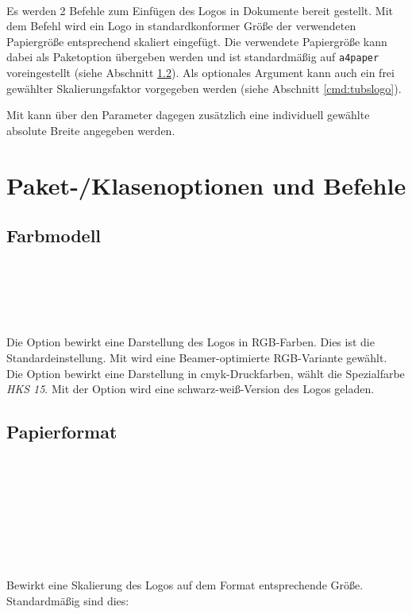 \begin{Declaration}
  \\
\end{Declaration}


Es werden 2 Befehle zum Einfügen des Logos in Dokumente bereit gestellt.
Mit dem Befehl  wird ein Logo in
standardkonformer Größe der verwendeten Papiergröße entsprechend skaliert
eingefügt. Die verwendete Papiergröße kann dabei als Paketoption übergeben
werden und ist standardmäßig auf \lstinline{a4paper} voreingestellt
(siehe Abschnitt \ref{options:papersize}).
Als optionales Argument kann auch ein frei gewählter Skalierungsfaktor
vorgegeben werden (siehe Abschnitt \ref{cmd:tubslogo}).

Mit  kann über den Parameter  dagegen
zusätzlich eine individuell gewählte absolute Breite angegeben werden.


\section{Paket-/Klasenoptionen und Befehle}

\subsection{Farbmodell}\label{options:color}

\begin{Declaration}
  \\
  \\
  \\
  \\
\end{Declaration}

Die Option  bewirkt eine Darstellung des Logos in RGB-Farben.
Dies ist die Standardeinstellung.
Mit  wird eine Beamer-optimierte RGB-Variante gewählt.
Die Option  bewirkt eine Darstellung in cmyk-Druckfarben,
 wählt die Spezialfarbe \emph{HKS 15}.
Mit der Option  wird eine schwarz-weiß-Version des Logos geladen.

\subsection{Papierformat}\label{options:papersize}

\begin{Declaration}
  \\
  \\
  \\
  \\
  \\
  \\
  \\
\end{Declaration}
Bewirkt eine Skalierung des Logos auf dem Format entsprechende Größe.
Standardmäßig sind dies:

